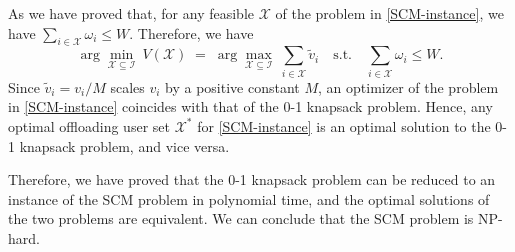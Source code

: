 \documentclass[lettersize,journal]{IEEEtran}
\begin{document}
As we have proved that, for any feasible $\mathcal{X}$ of the problem in \eqref{SCM-instance}, we have $\sum_{i\in \mathcal{X}}\omega_i\le W$. Therefore, we have
\[
\arg\min_{\mathcal{X}\subseteq \mathcal{I}}\ V(\mathcal{X})
\;=\;
\arg\max_{\mathcal{X}\subseteq \mathcal{I}}\ \sum_{i\in \mathcal{X}}\tilde v_i
\quad\text{s.t.}\quad
\sum_{i\in \mathcal{X}}\omega_i\le W.
\]
Since $\tilde v_i=v_i/M$ scales $v_i$ by a positive constant $M$, an optimizer of the problem in \eqref{SCM-instance} coincides with that of the 0-1 knapsack problem. Hence, any optimal offloading user set $\mathcal{X}^*$ for \eqref{SCM-instance} is an optimal solution to the 0-1 knapsack problem, and vice versa.

Therefore, we have proved that the 0-1 knapsack problem can be reduced to an instance of the SCM problem in polynomial time, and the optimal solutions of the two problems are equivalent. We can conclude that the SCM problem is NP-hard.
\end{document}
